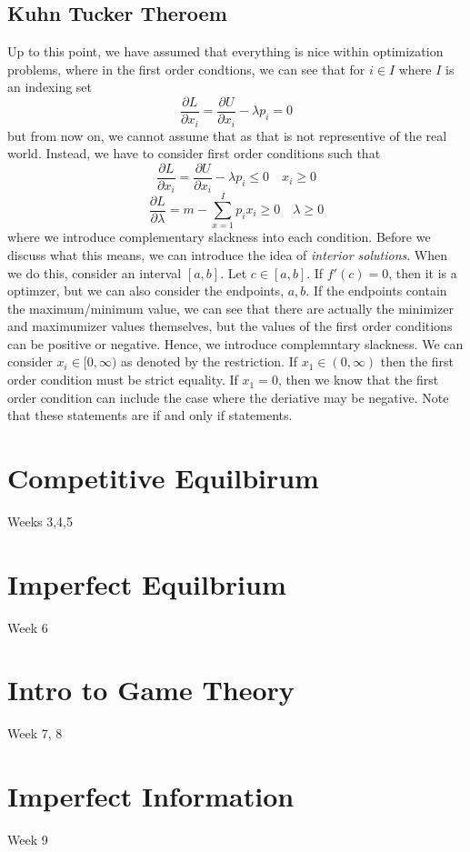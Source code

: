 \documentclass[12pt]{article}
\begin{document}
\subsection{Kuhn Tucker Theroem}
Up to this point, we have assumed that everything is nice within optimization problems, where in the first order condtions, we can see that for $i \in I$ where $I$ is an indexing set
\[
\frac{\partial L}{\partial x_i} = \frac{\partial U}{\partial x_i} - \lambda p_i = 0
\]
but from now on, we cannot assume that as that is not representive of the real world. Instead, we have to consider first order conditions such that
\[
\frac{\partial L}{\partial x_i} =  \frac{\partial U}{\partial x_i} - \lambda p_i \leq 0 \quad x_i \geq 0
\] 
\[
\frac{\partial L}{\partial \lambda} = m - \sum_{x=1}^I p_i x_i \geq 0 \quad \lambda \geq 0 
\]
where we introduce complementary slackness into each condition. Before we discuss what this means, we can introduce the idea of \emph{interior solutions}. When we do this, consider an interval $[a,b]$. Let $c \in [a,b]$. If $f'(c) = 0$, then it is a optimzer, but we can also consider the endpoints, $a,b$. If the endpoints contain the maximum/minimum value, we can see that there are actually the minimizer and maximumizer values themselves, but the values of the first order conditions can be positive or negative. Hence, we introduce complemntary slackness. We can consider $x_i \in [0, \infty)$ as denoted by the restriction. If $x_1 \in (0,\infty)$ then the first order condition must be strict equality. If $x_1 = 0$, then we know that the first order condition can include the case where the deriative may be negative. Note that these statements are if and only if statements. 
\section{Competitive Equilbirum}
Weeks 3,4,5
\section{Imperfect Equilbrium}
Week 6
\section{Intro to Game Theory}
Week 7, 8
\section{Imperfect Information}
Week 9
\end{document}
